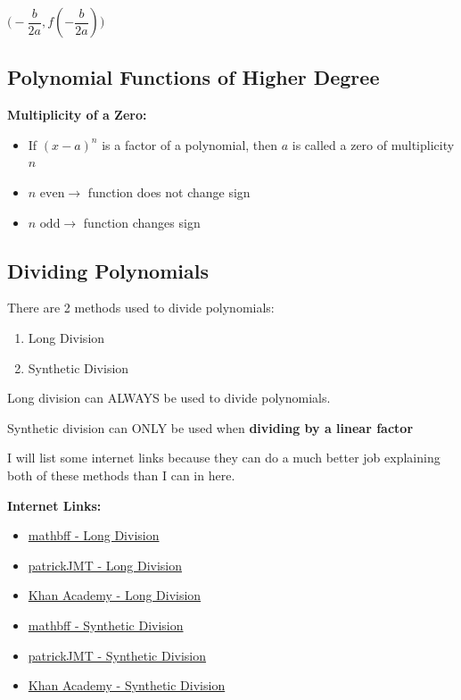 \documentclass[12pt]{article}
\begin{document}
\centerline{$\Big(-\dfrac{b}{2a}, f(-\dfrac{b}{2a}) \Big)$}

\newpage

\subsection{Polynomial Functions of Higher Degree}

\textbf{Multiplicity of a Zero:}
\newline

\begin{itemize}
\item If $(x-a)^{n}$ is a factor of a polynomial, then $a$ is called a zero of multiplicity $n$
\item $n \text{ even} \to $ function does not change sign
\item $n \text{ odd} \to $ function changes sign 
\end{itemize}

\subsection{Dividing Polynomials}

There are 2 methods used to divide polynomials:

\begin{enumerate}
\item Long Division
\item Synthetic Division
\end{enumerate}

Long division can ALWAYS be used to divide polynomials. 

Synthetic division can ONLY be used when \textbf{dividing by a linear factor}

I will list some internet links because they can do a much better job explaining both of these methods than I can in here.

\textbf{Internet Links:}

\begin{itemize}
\item \href{https://www.youtube.com/watch?v=Ih1wb6AxhMI}{mathbff - Long Division} 

\item \href{https://www.youtube.com/watch?v=l6_ghhd7kwQ}{patrickJMT - Long Division}

\item \href{https://www.youtube.com/watch?v=FXgV9ySNusc}{Khan Academy - Long Division}

\item \href{https://www.youtube.com/watch?v=lLgRS0mUZLw}{mathbff - Synthetic Division} 

\item \href{https://www.youtube.com/watch?v=bZoMz1Cy1T4}{patrickJMT - Synthetic Division}

\item \href{https://www.youtube.com/watch?v=1byR9UEQJN0}{Khan Academy - Synthetic Division}

\end{itemize}
\end{document}
